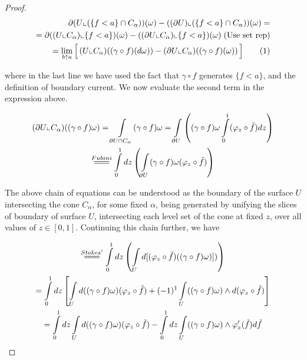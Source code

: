 \documentclass{amsart}
\newcommand\numberthis{\addtocounter{equation}{1}\tag{\theequation}}
\theoremstyle{named}
\begin{document}
\begin{proof}

    \begin{align*}
        \partial(U \llcorner (\{f < a\} \cap C_{\alpha}))(\omega) - ((\partial U) \llcorner (\{f < a\} \cap C_{\alpha}))(\omega) = \\
        = \partial((U \llcorner C_{\alpha}) \llcorner \{f < a \})(\omega) - ((\partial U \llcorner C_{\alpha}) \llcorner \{f < a \})(\omega) \; \text{(Use set rep)} \\
        = \lim\limits_{b \uparrow a} \Big[ \left( U \llcorner C_{\alpha})(( \gamma \circ f )(d\omega)) - (\partial U \llcorner C_{\alpha})(( \gamma \circ f )(\omega)\right) \Big] \label{eqn: bound_cur} \numberthis \\
    \end{align*}
    
    where in the last line we have used the fact that $\gamma \circ f$ generates $\{f < a\}$, and the definition of boundary current. We now evaluate the second term in the expression above.
    
    \begin{gather*}
        (\partial U \llcorner C_{\alpha})((\gamma \circ f)\omega) = \int\limits_{\partial U \cap C_{\alpha}}(\gamma \circ f)\omega = \int\limits_{\partial U}\left( (\gamma \circ f)\omega \int\limits_{0}^{1}(\varphi_z \circ \tilde{f})dz  \right) \\ \stackrel{Fubini}{=\joinrel=\joinrel=} \int\limits_{0}^{1} dz \left( \int\limits_{\partial U}(\gamma \circ f)\omega (\varphi_z \circ \tilde{f})  \right)
    \end{gather*}
    
    The above chain of equations can be understood as the boundary of the surface $U$ intersecting the cone $C_{\alpha}$, for some fixed $\alpha$, being generated by unifying the slices of boundary of surface $U$, intersecting each level set of the cone at fixed $z$, over all values of $z \in [0,1]$. Continuing this chain further, we have
    
    \begin{gather*}
        \stackrel{Stokes'}{=\joinrel=\joinrel=} \int\limits_{0}^{1} dz\left( \int\limits_{U} d[(\varphi_z \circ \tilde{f})((\gamma \circ f)\omega)]) \right) \\ 
        = \int\limits_{0}^{1}dz \left[ \int\limits_{U}d((\gamma \circ f)\omega) (\varphi_z \circ \tilde{f}) + (-1)^1 \int\limits_{U}((\gamma \circ f)\omega) \wedge d(\varphi_z \circ \tilde{f}) \right] \\ 
        = \int\limits_{0}^{1} dz\int\limits_{U}d((\gamma \circ f)\omega) (\varphi_z \circ \tilde{f}) - \int\limits_{0}^{1} dz\int\limits_{U} ((\gamma \circ f)\omega) \wedge \varphi_{z}'(\tilde{f})d\tilde{f}
    \end{gather*}
    

\end{proof}
\end{document}
